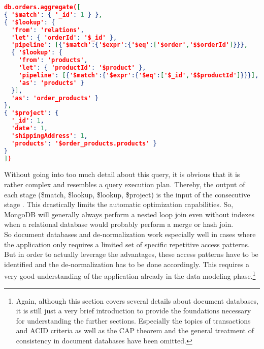 \begin{lstlisting}[language=JSON, caption=Document Database -- MongoDB Join Example, captionpos=b, label=lst:JSONDocument]
db.orders.aggregate([
{ '$match': { '_id': 1 } },
{ '$lookup': {
  'from': 'relations',
  'let': { 'orderId': '$_id' },
  'pipeline': [{'$match':{'$expr':{'$eq':['$order','$$orderId']}}},
  { '$lookup': {
    'from': 'products',
    'let': { 'productId': '$product' },
    'pipeline': [{'$match':{'$expr':{'$eq':['$_id','$$productId']}}}],
    'as': 'products' }
  }],
  'as': 'order_products' }
},
{ '$project': {
  '_id': 1,
  'date': 1,
  'shippingAddress': 1,
  'products': '$order_products.products' }
}
])
\end{lstlisting}

Without going into too much detail about this query, it is obvious that it is rather complex and resembles a query execution plan. Thereby, the output of each stage (\$match, \$lookup, \$lookup, \$project) is the input of the consecutive stage \cite{MongoDBAggrPipeline}. This drastically limits the automatic optimization capabilities. So, MongoDB will generally always perform a nested loop join even without indexes when a relational database would probably perform a merge or hash join.\\
 
So document databases and de-normalization work especially well in cases where the application only requires a limited set of specific repetitive access patterns. But in order to actually leverage the advantages, these access patterns have to be identified and the de-normalization has to be done accordingly. This requires a very good understanding of the application already in the data modeling phase.\footnote{Again, although this section covers several details about document databases, it is still just a very brief introduction to provide the foundations necessary for understanding the further sections. Especially the topics of transactions and ACID criteria as well as the CAP theorem and the general treatment of consistency in document databases have been omitted.} 

